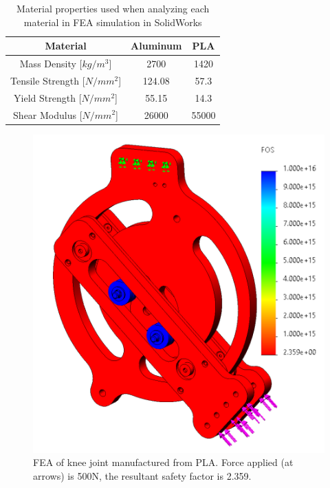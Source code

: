 \begin{table}
    \centering
    \begin{tabular}{ |c|c|c| }
        \hline
        Material & Aluminum & PLA \\
        \hline \hline
        Mass Density [$kg/m^3$] & 2700 & 1420 \\
        \hline
        Tensile Strength [$N/mm^2$] & 124.08 & 57.3\\
        \hline
        Yield Strength [$N/mm^2$] & 55.15 & 14.3\\ 
        \hline
        Shear Modulus [$N/mm^2$] & 26000 & 55000\\
        \hline
    \end{tabular}
    \caption{Material properties used when analyzing each material in FEA simulation in SolidWorks}
    \label{table:MaterialProperties}
\end{table}

\begin{figure}[ht!]
    \centering
    \includegraphics[width=0.8\linewidth]{Figures/Design/FEA_PLA_45deg.png}
    \caption{FEA of knee joint manufactured from PLA. Force applied (at arrows) is 500N, the resultant safety factor is 2.359.}
    \label{fig:FEA_PLA}
\end{figure}

